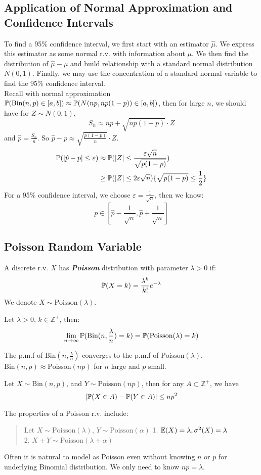 \subsection{Application of Normal Approximation and Confidence Intervals}
To find a 95\% confidence interval, we first start with an estimator $\hat{\mu}$. We express this estimator as some normal r.v. with information about $\mu$. We then find the distribution of $\hat{\mu} - \mu$ and build relationship with a standard normal distribution $N(0, 1)$. Finally, we may use the concentration of a standard normal variable to find the 95\% confidence interval. \\
Recall with normal approximation $\mathbb{P}(\text{Bin}(n, p) \in [a, b]) \approx \mathbb{P}(N(np, np(1-p)) \in [a, b])$, then for large $n$, we should have for $Z \sim N(0, 1)$,
$$S_n \approx np + \sqrt{np(1-p)} \cdot Z$$
and $\hat{p} = \frac{S_n}{n}$. So $\hat{p} - p \approx \sqrt{\frac{p(1-p)}{n}} \cdot Z$.
\begin{align*}
    \mathbb{P}(|\hat{p} - p| \le \varepsilon) &\approx \mathbb{P}(|Z| \le \frac{\varepsilon \sqrt{n}}{\sqrt{p(1-p)}}) \\
    &\ge \mathbb{P}(|Z| \le 2\varepsilon\sqrt{n}) \{\sqrt{p(1-p)} \le \frac{1}{2}\}
\end{align*}
For a 95\% confidence interval, we choose $\varepsilon = \frac{1}{\sqrt{n}}$, then we know:
$$p \in [\hat{p} - \frac{1}{\sqrt{n}}, \hat{p} + \frac{1}{\sqrt{n}}]$$

\subsection{Poisson Random Variable}
\begin{definition}
    A discrete r.v. $X$ has \textbf{\textit{Poisson}} distribution with parameter $\lambda > 0$ if:
    $$\mathbb{P}(X = k) = \frac{\lambda^k}{k!}e^{-\lambda}$$
    We denote $X \sim \text{Poisson}(\lambda)$.
\end{definition}
\begin{theorem}
    Let $\lambda > 0$, $k \in \mathbb{Z}^+$, then:
    $$\lim_{n \to \infty} \mathbb{P}(\text{Bin}(n, \frac{\lambda}{n}) = k) = \mathbb{P}(\text{Poisson}(\lambda) = k)$$
\end{theorem}
The p.m.f of $\text{Bin}(n, \frac{\lambda}{n})$ converges to the p.m.f of $\text{Poisson}(\lambda)$. \\
$\text{Bin}(n, p) \approx \text{Poisson}(np)$ for $n$ large and $p$ small.
\begin{theorem}
    Let $X \sim \text{Bin}(n, p)$, and $Y \sim \text{Poisson}(np)$, then for any $A \subset \mathbb{Z}^+$, we have
    $$|\mathbb{P}(X \in A) - \mathbb{P}(Y \in A)| \le np^2$$
\end{theorem}
The properties of a Poisson r.v. include:
\begin{quote}
    Let $X \sim \text{Poisson}(\lambda)$, $Y \sim \text{Poisson}(\alpha)$
    1. $\mathbb{E}(X) = \lambda, \sigma^2(X) = \lambda$ \\
    2. $X + Y \sim \text{Poisson}(\lambda + \alpha)$
\end{quote}
Often it is natural to model as Poisson even without knowing $n$ or $p$ for
underlying Binomial distribution. We only need to know $np = \lambda$.

